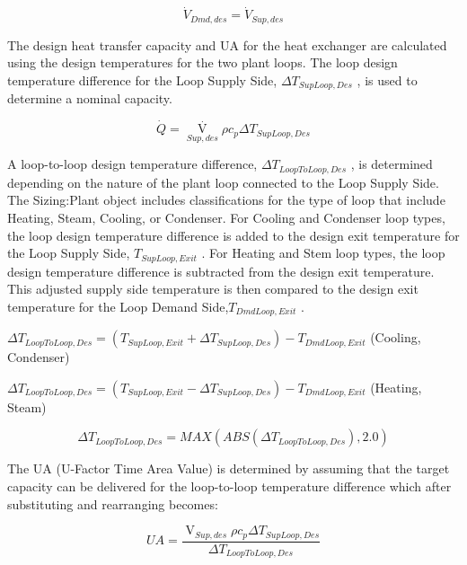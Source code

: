 \begin{equation}
{\dot V_{Dmd,des}} = {\dot V_{Sup,des}}
\end{equation}

The design heat transfer capacity and UA for the heat exchanger are calculated using the design temperatures for the two plant loops. The loop design temperature difference for the Loop Supply Side, \(\Delta {T_{SupLoop,Des}}\) , is used to determine a nominal capacity.

\begin{equation}
\dot Q = {\mathop V\limits^._{Sup,des}}\rho {c_p}\Delta {T_{SupLoop,Des}}
\end{equation}

A loop-to-loop design temperature difference, \(\Delta {T_{LoopToLoop,Des}}\) , is determined depending on the nature of the plant loop connected to the Loop Supply Side. The Sizing:Plant object includes classifications for the type of loop that include Heating, Steam, Cooling, or Condenser. For Cooling and Condenser loop types, the loop design temperature difference is added to the design exit temperature for the Loop Supply Side, \({T_{SupLoop,Exit}}\) . For Heating and Stem loop types, the loop design temperature difference is subtracted from the design exit temperature. This adjusted supply side temperature is then compared to the design exit temperature for the Loop Demand Side,\({T_{DmdLoop,Exit}}\) .

\(\Delta {T_{LoopToLoop,Des}} = \left( {{T_{SupLoop,Exit}} + \Delta {T_{SupLoop,Des}}} \right) - {T_{DmdLoop,Exit}}\) (Cooling, Condenser)

\(\Delta {T_{LoopToLoop,Des}} = \left( {{T_{SupLoop,Exit}} - \Delta {T_{SupLoop,Des}}} \right) - {T_{DmdLoop,Exit}}\) (Heating, Steam)

\begin{equation}
\Delta {T_{LoopToLoop,Des}} = MAX\left( {ABS\left( {\Delta {T_{LoopToLoop,Des}}} \right),2.0} \right)
\end{equation}

The UA (U-Factor Time Area Value) is determined by assuming that the target capacity can be delivered for the loop-to-loop temperature difference which after substituting and rearranging becomes:

\begin{equation}
UA = \frac{{{{\mathop {V}\limits }_{Sup,des}}\rho {c_p}\Delta {T_{SupLoop,Des}}}}{{\Delta {T_{LoopToLoop,Des}}}}
\end{equation}

